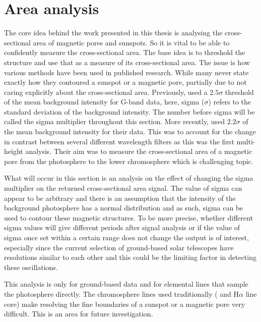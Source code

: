 \section{Area analysis}

	The core idea behind the work presented in this thesis is analysing the cross-sectional area of magnetic pores and sunspots.
	So it is vital to be able to confidently measure the cross-sectional area.
    The base idea is to threshold the structure and use that as a measure of its cross-sectional area.
    The issue is how various methods have been used in published research.
    While many never state exactly how they contoured a sunspot or a magnetic pore, partially due to not caring explicitly about the cross-sectional area.
    Previously, \cite{morton2011} used a $2.5\sigma$ threshold of the mean background intensity for G-band data, here, sigma ($\sigma$) refers to the standard deviation of the background intensity.
    The number before sigma will be called the sigma multiplier throughout this section.
	More recently, \cite{0004-637X-806-1-132} used $2.2\sigma$ of the mean background intensity for their data.
    This was to account for the change in contrast between several different wavelength filters as this was the first multi-height analysis.
    Their aim was to measure the cross-sectional area of a magnetic pore from the photosphere to the lower chromosphere which is challenging topic.
	
	What will occur in this section is an analysis on the effect of changing the sigma multiplier on the returned cross-sectional area signal.
    The value of sigma can appear to be arbitrary and there is an assumption that the intensity of the background photosphere has a normal distribution and as such, sigma can be used to contour these magnetic structures.
    To be more precise, whether different sigma values will give different periods after signal analysis or if the value of sigma once set within a certain range does not change the output is of interest, especially since the current selection of ground-based solar telescopes have resolutions similar to each other and this could be the limiting factor in detecting these oscillations.
    
	This analysis is only for ground-based data and for elemental lines that sample the photosphere directly.
	The chromosphere lines used traditionally ( and H$\alpha$ line core) make resolving the fine boundaries of a sunspot or a magnetic pore very difficult.
    This is an area for future investigation.
    
